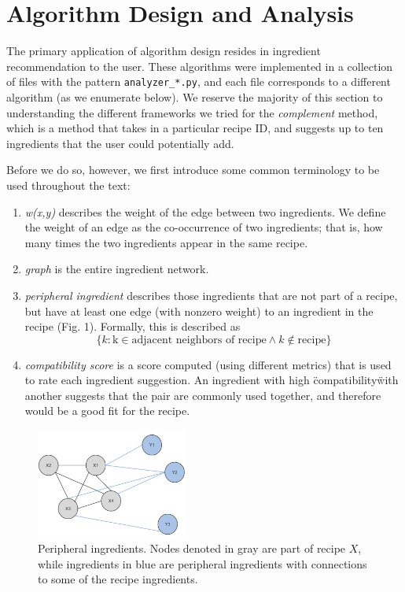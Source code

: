 \documentclass{acm_proc_article-sp}
\begin{document}
\section{Algorithm Design and Analysis}

The primary application of algorithm design resides in ingredient recommendation to the user. These algorithms were implemented in a collection of files with the pattern \texttt{analyzer\_*.py}, and each file corresponds to a different algorithm (as we enumerate below). We reserve the majority of this section to understanding the different frameworks we tried for the \textit{complement} method, which is a method that takes in a particular recipe ID, and suggests up to ten ingredients that the user could potentially add. 

Before we do so, however, we first introduce some common terminology to be used throughout the text:
\begin{enumerate}
	\item \textit{w(x,y)} describes the weight of the edge between two ingredients. We define the weight
	of an edge as the co-occurrence of two ingredients; that is, how many times the two ingredients 
	appear in the same recipe. 
	\item \textit{graph} is the entire ingredient network.
	\item \textit{peripheral ingredient} describes those ingredients that are not part of a recipe, but have at least one edge (with nonzero weight) to an ingredient in the recipe (Fig. 1). Formally, this is described as
	\[\{k : \text{k} \in \text{adjacent neighbors of recipe} \wedge k \notin \text{recipe}\}
	\]
	\item \textit{compatibility score} is a score computed (using different metrics) that
	is used to rate each ingredient suggestion. An ingredient with high \"compatibility\"
	with another suggests that the pair are commonly used together, and therefore
	would be a good fit for the recipe.
\end{enumerate}


\begin{figure}
	\centering
	\includegraphics[width=5cm]{peripheral}
	\caption{Peripheral ingredients. Nodes denoted in gray are part of recipe $X$, while ingredients in blue
	are peripheral ingredients with connections to some of the recipe ingredients.}
\end{figure}
\end{document}
